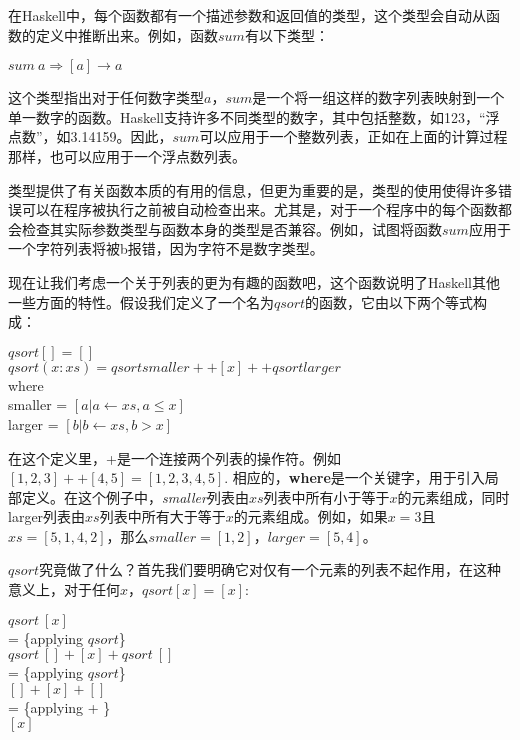 在Haskell中，每个函数都有一个描述参数和返回值的类型，这个类型会自动从函数的定义中推断出来。例如，函数$sum$有以下类型：

\noindent\hspace*{1cm} $sum ~a \Rightarrow [a] \rightarrow a$

这个类型指出对于任何数字类型$a$，$sum$是一个将一组这样的数字列表映射到一个单一数字的函数。Haskell支持许多不同类型的数字，其中包括整数，如123，“浮点数”，如3.14159。因此，$sum$可以应用于一个整数列表，正如在上面的计算过程那样，也可以应用于一个浮点数列表。

类型提供了有关函数本质的有用的信息，但更为重要的是，类型的使用使得许多错误可以在程序被执行之前被自动检查出来。尤其是，对于一个程序中的每个函数都会检查其实际参数类型与函数本身的类型是否兼容。例如，试图将函数$sum$应用于一个字符列表将被b报错，因为字符不是数字类型。

现在让我们考虑一个关于列表的更为有趣的函数吧，这个函数说明了Haskell其他一些方面的特性。假设我们定义了一个名为$qsort$的函数，它由以下两个等式构成：

\hspace*{1cm} $qsort [] = []$\\
\hspace*{1cm} $qsort (x : xs) = qsort smaller ++ [x] ++ qsort larger$\\
\hspace*{3cm}                  where\\
\hspace*{4cm}                     smaller = $[a | a \leftarrow xs, a ≤ x ]$\\
\hspace*{4cm}                     larger = $[b | b \leftarrow xs, b > x ]$

在这个定义里，+是一个连接两个列表的操作符。例如$[1, 2, 3] ++ [4, 5] = [1, 2,
3, 4, 5]$.
相应的，\textbf{where}是一个关键字，用于引入局部定义。在这个例子中，\textit{smaller}列表由$xs$列表中所有小于等于$x$的元素组成，同时larger列表由$xs$列表中所有大于等于$x$的元素组成。例如，如果$x
= 3$且$xs = [ 5, 1, 4, 2]$，那么$smaller = [1, 2]$，$larger = [5, 4]$。

$qsort$究竟做了什么？首先我们要明确它对仅有一个元素的列表不起作用，在这种意义上，对于任何$x$，$qsort [x] = [x]$:

\noindent\hspace*{1cm} $qsort~[x]$\\
\hspace*{1cm} = \{applying $qsort$\}\\
\hspace*{1cm} $qsort~[] + [x] + qsort~[]$\\
\hspace*{1cm} = \{applying $qsort$\}\\
\hspace*{1cm} $[] + [x] + []$\\
\hspace*{1cm} = \{applying + \}\\
\hspace*{1cm} $[x]$

